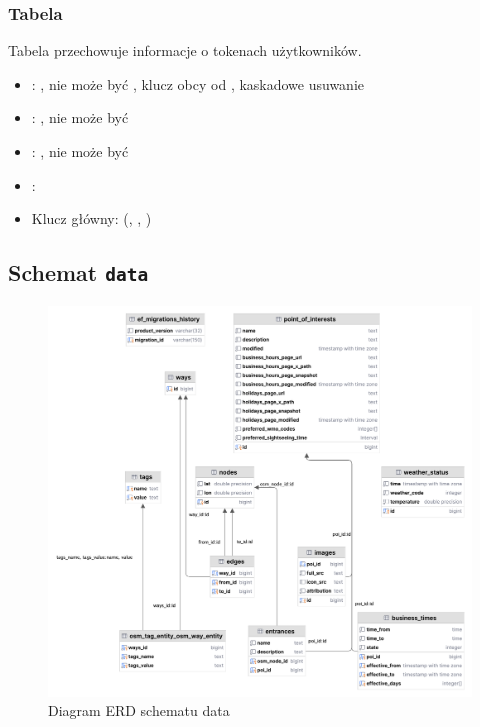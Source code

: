 \subsubsection{Tabela }
Tabela przechowuje informacje o tokenach użytkowników.
\begin{itemize}
    \item {}: , nie może być , klucz obcy od , kaskadowe usuwanie
    \item {}: , nie może być 
    \item {}: , nie może być 
    \item {}: 
    \item Klucz główny: (, , )
\end{itemize}

\subsection{Schemat \texttt{data}}

\begin{figure}[H]
\centering
\includegraphics[width=1\textwidth]{attachments/data}
\caption{Diagram ERD schematu data}
\label{fig:figure}
\end{figure}

